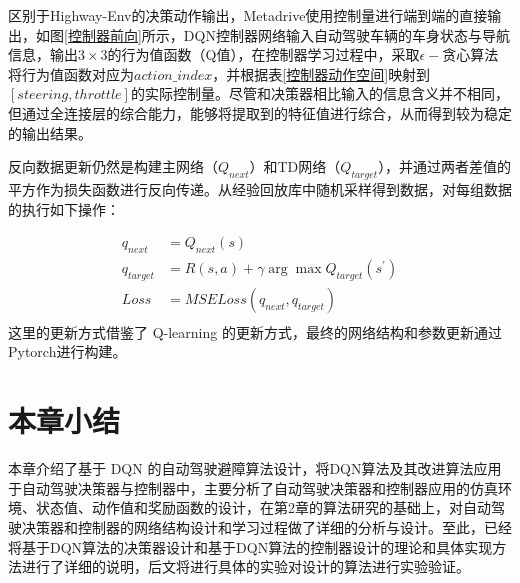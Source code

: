 区别于Highway-Env的决策动作输出，Metadrive使用控制量进行端到端的直接输出，如图\ref{控制器前向}所示，DQN控制器网络输入自动驾驶车辆的车身状态与导航信息，输出$3 \times 3$的行为值函数（Q值），在控制器学习过程中，采取$\epsilon-$贪心算法将行为值函数对应为$action\_index$，并根据表\ref{控制器动作空间}映射到$[steering, throttle]$的实际控制量。尽管和决策器相比输入的信息含义并不相同，但通过全连接层的综合能力，能够将提取到的特征值进行综合，从而得到较为稳定的输出结果。

反向数据更新仍然是构建主网络（$Q_{next}$）和TD网络（$Q_{target}$），并通过两者差值的平方作为损失函数进行反向传递。从经验回放库中随机采样得到数据，对每组数据的执行如下操作：

\begin{equation}
    \begin{aligned}
        q_{next} &= Q_{next}(s)\\
        q_{target} &= R(s,a) + \gamma \arg \max Q_{target}(s^{'})\\
        Loss &= MSELoss(q_{next},q_{target})\\
    \end{aligned}
\end{equation}
这里的更新方式借鉴了 Q-learning 的更新方式，最终的网络结构和参数更新通过Pytorch进行构建。

\section{本章小结} %

本章介绍了基于 DQN 的自动驾驶避障算法设计，将DQN算法及其改进算法应用于自动驾驶决策器与控制器中，主要分析了自动驾驶决策器和控制器应用的仿真环境、状态值、动作值和奖励函数的设计，在第2章的算法研究的基础上，对自动驾驶决策器和控制器的网络结构设计和学习过程做了详细的分析与设计。至此，已经将基于DQN算法的决策器设计和基于DQN算法的控制器设计的理论和具体实现方法进行了详细的说明，后文将进行具体的实验对设计的算法进行实验验证。
